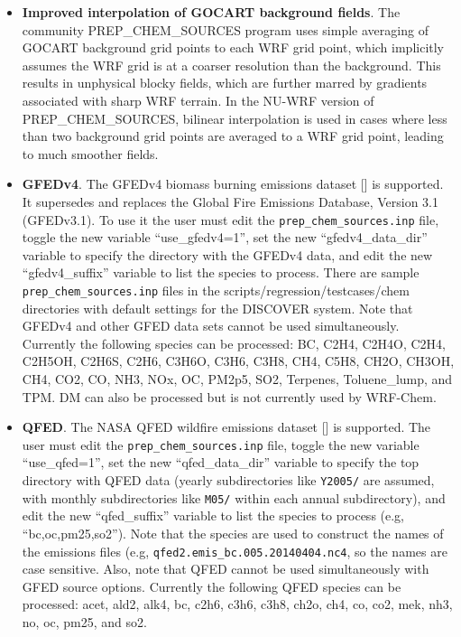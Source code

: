 \begin{itemize}
\begin{itemize}
\item \textbf{Improved interpolation of GOCART background fields}. The
community PREP\_CHEM\_SOURCES program uses simple averaging of GOCART
background grid points to each WRF grid point, which implicitly assumes the
WRF grid is at a coarser resolution than the background. This results in
unphysical blocky fields, which are further marred by gradients associated
with sharp WRF terrain. In the NU-WRF version of PREP\_CHEM\_SOURCES, 
bilinear interpolation is used in cases where less than two background grid
points are averaged to a WRF grid point, leading to much smoother fields.

\item \textbf{GFEDv4}. The GFEDv4 biomass burning emissions dataset
[\cite{ref:RandersonEtAl2015}] is supported. It supersedes and replaces the Global Fire Emissions Database, Version 3.1 (GFEDv3.1). To use it the user must edit the \texttt{prep\_chem\_sources.inp} file, toggle the new  variable ``use\_gfedv4=1'', set the new ``gfedv4\_data\_dir'' variable to 
specify the directory with the GFEDv4 data, and edit the new 
``gfedv4\_suffix'' variable to list the species to process.  
There are sample \texttt{prep\_chem\_sources.inp} files
in the scripts/regression/testcases/chem directories with default settings
for the DISCOVER system. Note that GFEDv4 and other GFED data sets cannot be used 
simultaneously. Currently the following species can be processed: BC, C2H4, C2H4O, C2H4, C2H5OH, C2H6S, C2H6, C3H6O, C3H6, C3H8, CH4, C5H8, CH2O, CH3OH, CH4, CO2, CO, NH3, NOx, OC, 
PM2p5, SO2, Terpenes, Toluene\_lump, and TPM. DM can also be processed but is 
not currently used by WRF-Chem.

\item \textbf{QFED}. The NASA QFED wildfire emissions dataset 
[\cite{ref:QfedDocumentation}] is supported. The user must edit the 
\texttt{prep\_chem\_sources.inp} file, toggle the new variable ``use\_qfed=1'',
set the new ``qfed\_data\_dir'' variable to specify the top directory with QFED
data (yearly subdirectories like \texttt{Y2005/} are assumed, with monthly 
subdirectories like \texttt{M05/} within each annual subdirectory), and edit 
the new ``qfed\_suffix'' variable to list the species to process (e.g, 
``bc,oc,pm25,so2''). Note that the species are used to construct the names of 
the emissions files (e.g, \texttt{qfed2.emis\_bc.005.20140404.nc4}, so the 
names are case sensitive. Also, note that QFED cannot be used simultaneously 
with GFED source options. Currently the following QFED species can be 
processed: acet, ald2, alk4, bc, c2h6, c3h6, c3h8, ch2o, ch4, co, co2, mek, 
nh3, no, oc, pm25, and so2.


\end{itemize}
\end{itemize}
